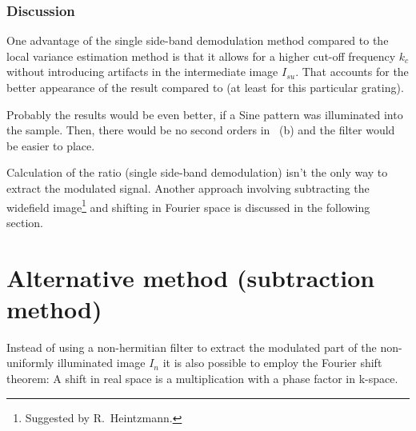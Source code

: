 \subsubsection*{Discussion}
One advantage of the single side-band demodulation method compared to
the local variance estimation method is that it allows for a higher
cut-off frequency $k_c$ without introducing artifacts in the
intermediate image $I_{su}$. That accounts for the better appearance
of the result  compared to  (at
least for this particular grating).

Probably the results would be even better, if a Sine pattern was
illuminated into the sample. Then, there would be no second orders in
~(b) and the filter would be easier to place.

Calculation of the ratio (single side-band demodulation) isn't the
only way to extract the modulated signal. Another approach involving
subtracting the widefield image\footnote{Suggested by R.~Heintzmann.}
and shifting in Fourier space is discussed in the following section.
\section{Alternative method (subtraction method)}
Instead of using a non-hermitian filter to extract the modulated part
of the non-uniformly illuminated image $I_n$ it is also possible to
employ the Fourier shift theorem: A shift in real space is 
a multiplication with a phase factor in k-space. 

